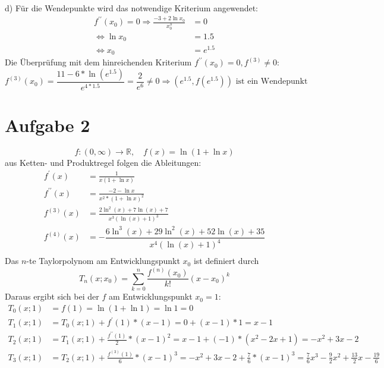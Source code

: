 \documentclass[a4paper]{article}
\begin{document}
\newpage

\par{d)} Für die Wendepunkte wird das notwendige Kriterium angewendet:
\begin{align*}
	f^{\prime\prime} (x_0)= 0 \Rightarrow \frac{-3+2 \ln x_0}{x_0^3} &= 0\\
	\Leftrightarrow \ln x_0 &= 1.5 \\
	\Leftrightarrow x_0 &= e^{1.5}
\end{align*}
Die Überprüfung mit dem hinreichenden Kriterium $f^{\prime\prime} (x_0) = 0, f^{(3)} \neq 0$:
\[ 
	f^{(3)} (x_0) = \frac{11 - 6*\ln(e^{1.5})}{e^{4*1.5}} = \frac{2}{e^6} \neq 0 
	\Longrightarrow (e^{1.5}, f(e^{1.5})) \text{ ist ein Wendepunkt}
\]

\newpage

\section*{Aufgabe 2}
\[ f: (0,\infty) \rightarrow \mathbb{R}, \quad f(x) = \ln(1 + \ln x) \]
aus Ketten- und Produktregel folgen die Ableitungen:
\begin{align*}
	f^\prime (x) &=
	\frac{1}{x (1+\ln x)} \\
	f^{\prime\prime} (x) &=
	\frac{-2 - \ln x}{x^2 * (1+\ln x)^2}\\
	f^{(3)} (x) &=
	\frac{2\ln^2\left(x\right)+7\ln\left(x\right)+7}{x^3\left(\ln\left(x\right)+1\right)^3} \\
	f^{(4)} (x) &=
	-\dfrac{6\ln^3\left(x\right)+29\ln^2\left(x\right)+52\ln\left(x\right)+35}{x^4\left(\ln\left(x\right)+1\right)^4} \\
\end{align*}
Das $n$-te Taylorpolynom am Entwicklungspunkt $x_0$ ist definiert durch
\[
	T_n(x;x_0) = \sum_{k=0}^n \frac{f^{(n)}(x_0)}{k!} (x-x_0)^k
	\]
Daraus ergibt sich bei der $f$ am Entwicklungspunkt $x_0 = 1$:
\begin{align*}
	T_0(x;1) &=
	f(1) = \ln (1 + \ln 1) = \ln 1 = 0 \\
	T_1(x;1) &=
	T_0(x;1) + f^\prime(1) * (x-1) = 0 + (x-1) * 1 = x - 1 \\
	T_2(x;1) &=
	T_1(x;1) + \frac{f^{\prime\prime}(1)}{2} * (x-1)^2 = x - 1 + (-1) * (x^2 - 2x + 1) = -x^2 + 3x -2 \\
	T_3(x;1) &=
	T_2(x;1) + \frac{f^{(3)}(1)}{6} * (x-1)^3 = -x^2 + 3x -2 + \frac{7}{6} * (x-1)^3 
	= \frac{7}{6} x^3 - \frac{9}{2} x^2 + \frac{13}{2} x - \frac{19}{6}
\end{align*}
\end{document}
